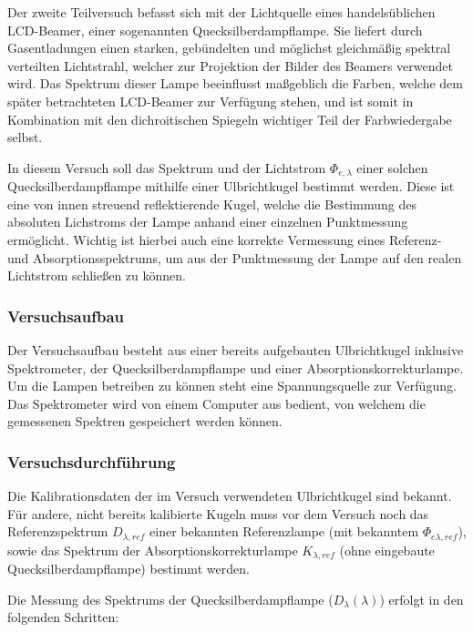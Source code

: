 Der zweite Teilversuch befasst sich mit der Lichtquelle eines handelsüblichen LCD-Beamer, einer sogenannten Quecksilberdampflampe. Sie liefert durch Gasentladungen einen starken, gebündelten und möglichst gleichmäßig spektral verteilten Lichtstrahl, welcher zur Projektion der Bilder des Beamers verwendet wird. Das Spektrum dieser Lampe beeinflusst maßgeblich die Farben, welche dem später betrachteten LCD-Beamer zur Verfügung stehen, und ist somit in Kombination mit den dichroitischen Spiegeln wichtiger Teil der Farbwiedergabe selbst.

In diesem Versuch soll das Spektrum und der Lichtstrom $\Phi_{e,\lambda}$ einer solchen Quecksilberdampflampe mithilfe einer Ulbrichtkugel bestimmt werden. Diese ist eine von innen streuend reflektierende Kugel, welche die Bestimmung des absoluten Lichstroms der Lampe anhand einer einzelnen Punktmessung ermöglicht. Wichtig ist hierbei auch eine korrekte Vermessung eines Referenz- und Absorptionsspektrums, um aus der Punktmessung der Lampe auf den realen Lichtstrom schließen zu können.

\subsubsection{Versuchsaufbau}

Der Versuchsaufbau besteht aus einer bereits aufgebauten Ulbrichtkugel inklusive Spektrometer, der Quecksilberdampflampe und einer Absorptionskorrekturlampe. Um die Lampen betreiben zu können steht eine Spannungsquelle zur Verfügung. Das Spektrometer wird von einem Computer aus bedient, von welchem die gemessenen Spektren gespeichert werden können.

\subsubsection{Versuchsdurchführung}

Die Kalibrationsdaten der im Versuch verwendeten Ulbrichtkugel sind bekannt. Für andere, nicht bereits kalibierte Kugeln muss vor dem Versuch noch das Referenzspektrum $D_{\lambda,ref}$ einer bekannten Referenzlampe (mit bekanntem $\Phi_{e\lambda,ref}$), sowie das Spektrum der Absorptionskorrekturlampe $K_{\lambda,ref}$ (ohne eingebaute Quecksilberdampflampe) bestimmt werden.

Die Messung des Spektrums der Quecksilberdampflampe ($D_\lambda(\lambda)$) erfolgt in den folgenden Schritten:

